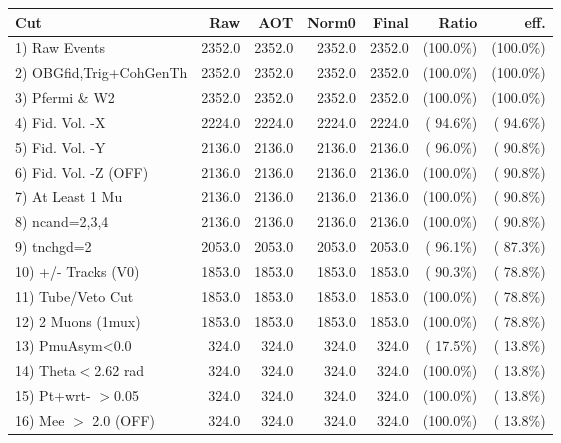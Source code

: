  \begin{table}[h!]\centering
 \begin{tabular}{||l||r|r|r|r|r|r||}
 \hline
 \hline
 Cut & Raw & AOT & Norm0 & Final & Ratio & eff.       \\
 \hline
  1) Raw Events           &       2352.0 &       2352.0 &       2352.0 &       2352.0 & (100.0\%) & (100.0\%) \\
  2) OBGfid,Trig+CohGenTh &       2352.0 &       2352.0 &       2352.0 &       2352.0 & (100.0\%) & (100.0\%) \\
  3) Pfermi \& W2         &       2352.0 &       2352.0 &       2352.0 &       2352.0 & (100.0\%) & (100.0\%) \\
  4) Fid. Vol. -X         &       2224.0 &       2224.0 &       2224.0 &       2224.0 & ( 94.6\%) & ( 94.6\%) \\
  5) Fid. Vol. -Y         &       2136.0 &       2136.0 &       2136.0 &       2136.0 & ( 96.0\%) & ( 90.8\%) \\
  6) Fid. Vol. -Z (OFF)   &       2136.0 &       2136.0 &       2136.0 &       2136.0 & (100.0\%) & ( 90.8\%) \\
  7) At Least 1 Mu        &       2136.0 &       2136.0 &       2136.0 &       2136.0 & (100.0\%) & ( 90.8\%) \\
  8) ncand=2,3,4          &       2136.0 &       2136.0 &       2136.0 &       2136.0 & (100.0\%) & ( 90.8\%) \\
  9) tnchgd=2             &       2053.0 &       2053.0 &       2053.0 &       2053.0 & ( 96.1\%) & ( 87.3\%) \\
 10) +/- Tracks (V0)      &       1853.0 &       1853.0 &       1853.0 &       1853.0 & ( 90.3\%) & ( 78.8\%) \\
 11) Tube/Veto Cut        &       1853.0 &       1853.0 &       1853.0 &       1853.0 & (100.0\%) & ( 78.8\%) \\
 12) 2 Muons (1mux)       &       1853.0 &       1853.0 &       1853.0 &       1853.0 & (100.0\%) & ( 78.8\%) \\
 13) PmuAsym<0.0          &        324.0 &        324.0 &        324.0 &        324.0 & ( 17.5\%) & ( 13.8\%) \\
 14) Theta$<$2.62 rad     &        324.0 &        324.0 &        324.0 &        324.0 & (100.0\%) & ( 13.8\%) \\
 15) Pt+wrt- $>$0.05      &        324.0 &        324.0 &        324.0 &        324.0 & (100.0\%) & ( 13.8\%) \\
 16) Mee $>$ 2.0  (OFF)   &        324.0 &        324.0 &        324.0 &        324.0 & (100.0\%) & ( 13.8\%) \\

\end{tabular}
\end{table}
